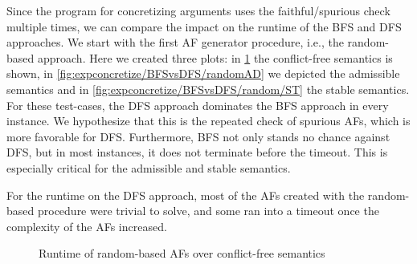 Since the program for concretizing arguments uses the faithful/spurious check multiple times, we can compare the impact on the runtime of the BFS and DFS approaches. We start with the first AF generator procedure, i.e., the random-based approach. Here we created three plots: in \cref{fig:expconcretize/BFSvsDFS/random/CF} the conflict-free semantics is shown, in \cref{fig:expconcretize/BFSvsDFS/randomAD} we depicted the admissible semantics and in \cref{fig:expconcretize/BFSvsDFS/random/ST} the stable semantics. For these test-cases, the DFS approach dominates the BFS approach in every instance. We hypothesize that this is the repeated check of spurious AFs, which is more favorable for DFS. Furthermore, BFS not only stands no chance against DFS, but in most instances, it does not terminate before the timeout. This is especially critical for the admissible and stable semantics.

For the runtime on the DFS approach, most of the AFs created with the random-based procedure were trivial to solve, and some ran into a timeout once the complexity of the AFs increased.


\begin{figure}[H]
    \centering
    \caption{Runtime of random-based AFs over conflict-free semantics}
    \label{fig:expconcretize/BFSvsDFS/random/CF}
\end{figure}


